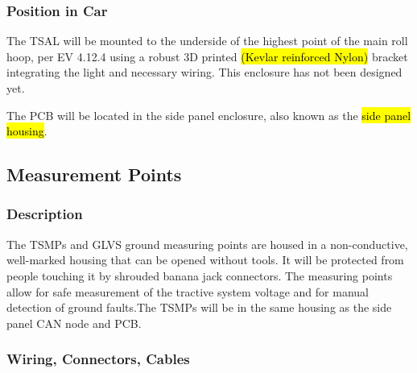\documentclass{article}
\DeclareRobustCommand{\hlr}[1]{{\sethlcolor{red}\hl{#1}}}
\begin{document}

        \subsubsection{Position in Car}

            The TSAL will be mounted to the underside of the highest point of the main roll hoop, per EV 4.12.4 using a robust 3D printed \hlr{(Kevlar reinforced Nylon)} bracket integrating the light and necessary wiring. This enclosure has not been designed yet.

            The PCB will be located in the side panel enclosure, also known as the \hlr{side panel housing}.

    \subsection{Measurement Points}

        \subsubsection{Description}


            The TSMPs and GLVS ground measuring points are housed in a non-conductive, well-marked housing that can be opened without tools. It will be protected from people touching it by shrouded banana jack connectors. The measuring points allow for safe measurement of the tractive system voltage and for manual detection of ground faults.The TSMPs will be in the same housing as the side panel CAN node and PCB.

        \subsubsection{Wiring, Connectors, Cables}
\end{document}
